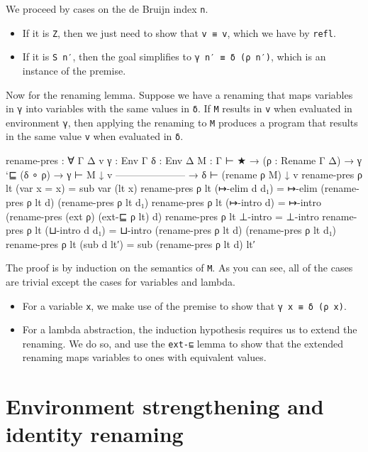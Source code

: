 We proceed by cases on the de Bruijn index \texttt{n}.

\begin{itemize}
\item
  If it is \texttt{Z}, then we just need to show that \texttt{v\ ≡\ v},
  which we have by \texttt{refl}.
\item
  If it is \texttt{S\ n′}, then the goal simplifies to
  \texttt{γ\ n′\ ≡\ δ\ (ρ\ n′)}, which is an instance of the premise.
\end{itemize}

Now for the renaming lemma. Suppose we have a renaming that maps
variables in \texttt{γ} into variables with the same values in
\texttt{δ}. If \texttt{M} results in \texttt{v} when evaluated in
environment \texttt{γ}, then applying the renaming to \texttt{M}
produces a program that results in the same value \texttt{v} when
evaluated in \texttt{δ}.

\begin{fence}
\begin{code}
rename-pres : ∀ {Γ Δ v} {γ : Env Γ} {δ : Env Δ} {M : Γ ⊢ ★}
  → (ρ : Rename Γ Δ)
  → γ `⊑ (δ ∘ ρ)
  → γ ⊢ M ↓ v
    ---------------------
  → δ ⊢ (rename ρ M) ↓ v
rename-pres ρ lt (var {x = x}) = sub var (lt x)
rename-pres ρ lt (↦-elim d d₁) =
   ↦-elim (rename-pres ρ lt d) (rename-pres ρ lt d₁)
rename-pres ρ lt (↦-intro d) =
   ↦-intro (rename-pres (ext ρ) (ext-⊑ ρ lt) d)
rename-pres ρ lt ⊥-intro = ⊥-intro
rename-pres ρ lt (⊔-intro d d₁) =
   ⊔-intro (rename-pres ρ lt d) (rename-pres ρ lt d₁)
rename-pres ρ lt (sub d lt′) =
   sub (rename-pres ρ lt d) lt′
\end{code}
\end{fence}

The proof is by induction on the semantics of \texttt{M}. As you can
see, all of the cases are trivial except the cases for variables and
lambda.

\begin{itemize}
\item
  For a variable \texttt{x}, we make use of the premise to show that
  \texttt{γ\ x\ ≡\ δ\ (ρ\ x)}.
\item
  For a lambda abstraction, the induction hypothesis requires us to
  extend the renaming. We do so, and use the \texttt{ext-⊑} lemma to
  show that the extended renaming maps variables to ones with equivalent
  values.
\end{itemize}

\hypertarget{environment-strengthening-and-identity-renaming}{%
\section{Environment strengthening and identity
renaming}\label{environment-strengthening-and-identity-renaming}}

